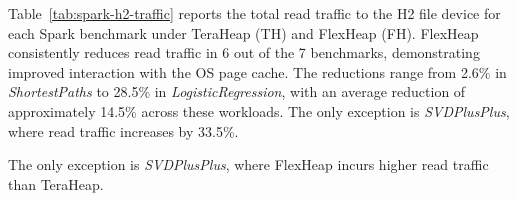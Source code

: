 Table~\ref{tab:spark-h2-traffic} reports the total read traffic to the H2 file device for each Spark benchmark under
TeraHeap (TH) and FlexHeap (FH). FlexHeap consistently reduces read traffic in 6 out of the 7 benchmarks,
demonstrating improved interaction with the OS page cache. The reductions range from 2.6\% in \textit{ShortestPaths}
to 28.5\% in \textit{LogisticRegression}, with an average reduction of approximately 14.5\% across these workloads.
The only exception is \textit{SVDPlusPlus}, where read traffic increases by 33.5\%. 

The only exception is \textit{SVDPlusPlus}, where FlexHeap incurs higher read traffic than TeraHeap. 

